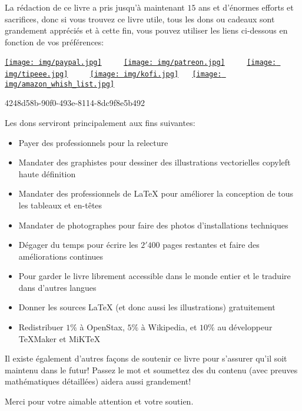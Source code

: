 La rédaction de ce livre a pris jusqu'à maintenant $15$ ans et d'énormes efforts et sacrifices, donc si vous trouvez ce livre utile, tous les dons ou cadeaux sont grandement appréciés et à cette fin, vous pouvez utiliser les liens ci-dessous en fonction de vos préférences:
	
	\begin{center}
	\href{https://www.paypal.me/scientificevolution}{\texttt{[image: img/paypal.jpg]}} $\qquad$ \href{https://www.patreon.com/sciences}{\texttt{[image: img/patreon.jpg]}} $\qquad$ \href{https://www.tipeee.com/elements-of-applied-mathematics}{\texttt{[image: img/tipeee.jpg]}} $\qquad$ \href{http://ko-fi.com/operamagistris}{\texttt{[image: img/kofi.jpg]}} $\quad$ \href{http://a.co/cqLIx5V}{\texttt{[image: img/amazon\_whish\_list.jpg]}}
	\end{center}
	\begin{center}
		{\large \faBitcoin} 4248d58b-90f0-493e-8114-8dc9f8e5b492
	\end{center}
	Les dons serviront principalement aux fins suivantes:
	\begin{itemize}
		\item Payer des professionnels pour la relecture
		\item Mandater des graphistes pour dessiner des illustrations vectorielles copyleft haute définition
		\item Mandater des professionnels de  \LaTeX{} pour améliorer la conception de tous les tableaux et en-têtes
		\item Mandater de photographes pour faire des photos d'installations techniques
		\item Dégager du temps pour écrire les $2'400$ pages restantes et faire des améliorations continues
		\item Pour garder le livre librement accessible dans le monde entier et le traduire dans d'autres langues
		\item Donner les sources \LaTeX{} (et donc aussi les illustrations) gratuitement
		\item Redistribuer $1\%$ à OpenStax, $5\%$ à Wikipedia, et $10\%$ au développeur TeXMaker et MiKTeX
	\end{itemize}
	Il existe également d'autres façons de soutenir ce livre pour s'assurer qu'il soit maintenu dans le futur! Passez le mot et soumettez des du contenu (avec preuves mathématiques détaillées) aidera aussi grandement!
	
	Merci pour votre aimable attention et votre soutien.